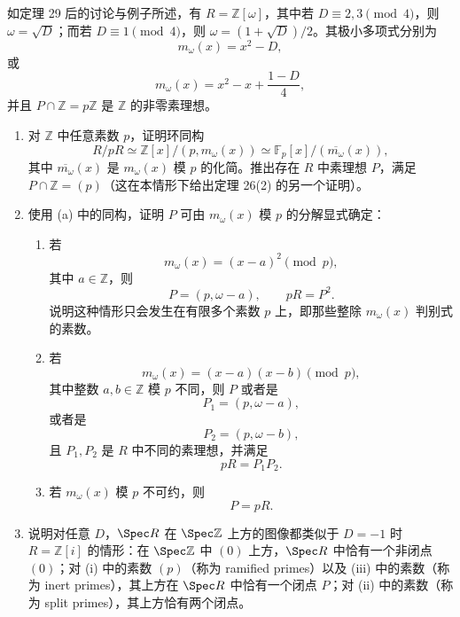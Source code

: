 \begin{enumerate}[label=\arabic*.]
	如定理 29 后的讨论与例子所述，有 $R=\mathbb Z[\omega]$，其中若 $D\equiv2,3\pmod 4$，则 $\omega=\sqrt D$；而若 $D\equiv1\pmod 4$，则 $\omega=(1+\sqrt D)/2$。其极小多项式分别为
	\[
	m_\omega(x)=x^2-D,
	\]
	或
	\[
	m_\omega(x)=x^2-x+\frac{1-D}{4},
	\]
	并且 $P\cap\mathbb Z=p\mathbb Z$ 是 $\mathbb Z$ 的非零素理想。
	\begin{enumerate}[label=(\alph*)]
		\item 对 $\mathbb Z$ 中任意素数 $p$，证明环同构
		\[
		R/pR\simeq \mathbb Z[x]/(p,m_\omega(x))
		\simeq\mathbb F_p[x]/(\overline{m_\omega}(x)),
		\]
		其中 $\overline{m_\omega}(x)$ 是 $m_\omega(x)$ 模 $p$ 的化简。推出存在 $R$ 中素理想 $P$，满足 $P\cap\mathbb Z=(p)$（这在本情形下给出定理 26(2) 的另一个证明）。
		
		\item 使用 (a) 中的同构，证明 $P$ 可由 $m_\omega(x)$ 模 $p$ 的分解显式确定：
		\begin{enumerate}[label=(\roman*)]
			\item 若
			\[
			m_\omega(x)=(x-a)^2\pmod p,
			\]
			其中 $a\in\mathbb Z$，则
			\[
			P=(p,\omega-a),
			\qquad
			pR=P^2.
			\]
			说明这种情形只会发生在有限多个素数 $p$ 上，即那些整除 $m_\omega(x)$ 判别式的素数。
			
			\item 若
			\[
			m_\omega(x)=(x-a)(x-b)\pmod p,
			\]
			其中整数 $a,b\in\mathbb Z$ 模 $p$ 不同，则 $P$ 或者是
			\[
			P_1=(p,\omega-a),
			\]
			或者是
			\[
			P_2=(p,\omega-b),
			\]
			且 $P_1,P_2$ 是 $R$ 中不同的素理想，并满足
			\[
			pR=P_1P_2.
			\]
			
			\item 若 $m_\omega(x)$ 模 $p$ 不可约，则
			\[
			P=pR.
			\]
		\end{enumerate}
		
		\item 说明对任意 $D$，$\Spec R$ 在 $\Spec\mathbb Z$ 上方的图像都类似于 $D=-1$ 时 $R=\mathbb Z[i]$ 的情形：在 $\Spec\mathbb Z$ 中 $(0)$ 上方，$\Spec R$ 中恰有一个非闭点 $(0)$；对 (i) 中的素数 $(p)$（称为 ramified primes）以及 (iii) 中的素数（称为 inert primes），其上方在 $\Spec R$ 中恰有一个闭点 $P$；对 (ii) 中的素数（称为 split primes），其上方恰有两个闭点。
	\end{enumerate}
\end{enumerate}

